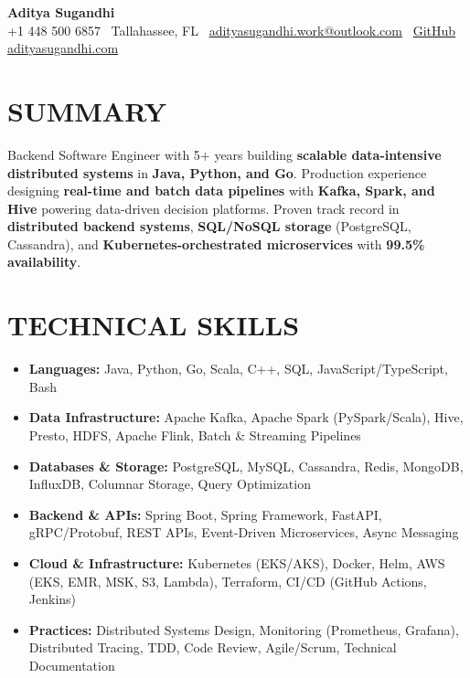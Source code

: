 \documentclass[letterpaper,10pt]{article}
\newcommand{\resumeItem}[1]{\item\small #1}
\begin{document}
\begin{center}
{\huge\textbf{Aditya Sugandhi}} \\
+1 448 500 6857 \textbar\ \textcolor{metablue}{Tallahassee, FL} \textbar\
\href{mailto:adityasugandhi.work@outlook.com}{adityasugandhi.work@outlook.com} \textbar\
\href{https://github.com/adityasugandhi}{GitHub}
\textbar \href{https://adityasugandhi.com}{adityasugandhi.com}
\end{center}
\vspace{-12pt}

\section{\textcolor{metablue}{SUMMARY}}
\small
\vspace{-6pt}
Backend Software Engineer with 5+ years building \textbf{scalable data-intensive distributed systems} in \textbf{Java, Python, and Go}. Production experience designing \textbf{real-time and batch data pipelines} with \textbf{Kafka, Spark, and Hive} powering data-driven decision platforms. Proven track record in \textbf{distributed backend systems}, \textbf{SQL/NoSQL storage} (PostgreSQL, Cassandra), and \textbf{Kubernetes-orchestrated microservices} with \textbf{99.5\% availability}.

\vspace{-9pt}

\section{\textcolor{metablue}{TECHNICAL SKILLS}}
\vspace{-5pt}
\small
\begin{itemize}
\resumeItem{\textbf{Languages:} Java, Python, Go, Scala, C++, SQL, JavaScript/TypeScript, Bash}
\resumeItem{\textbf{Data Infrastructure:} Apache Kafka, Apache Spark (PySpark/Scala), Hive, Presto, HDFS, Apache Flink, Batch \& Streaming Pipelines}
\resumeItem{\textbf{Databases \& Storage:} PostgreSQL, MySQL, Cassandra, Redis, MongoDB, InfluxDB, Columnar Storage, Query Optimization}
\resumeItem{\textbf{Backend \& APIs:} Spring Boot, Spring Framework, FastAPI, gRPC/Protobuf, REST APIs, Event-Driven Microservices, Async Messaging}
\resumeItem{\textbf{Cloud \& Infrastructure:} Kubernetes (EKS/AKS), Docker, Helm, AWS (EKS, EMR, MSK, S3, Lambda), Terraform, CI/CD (GitHub Actions, Jenkins)}
\resumeItem{\textbf{Practices:} Distributed Systems Design, Monitoring (Prometheus, Grafana), Distributed Tracing, TDD, Code Review, Agile/Scrum, Technical Documentation}
\end{itemize}
\vspace{-10pt}
\end{document}
